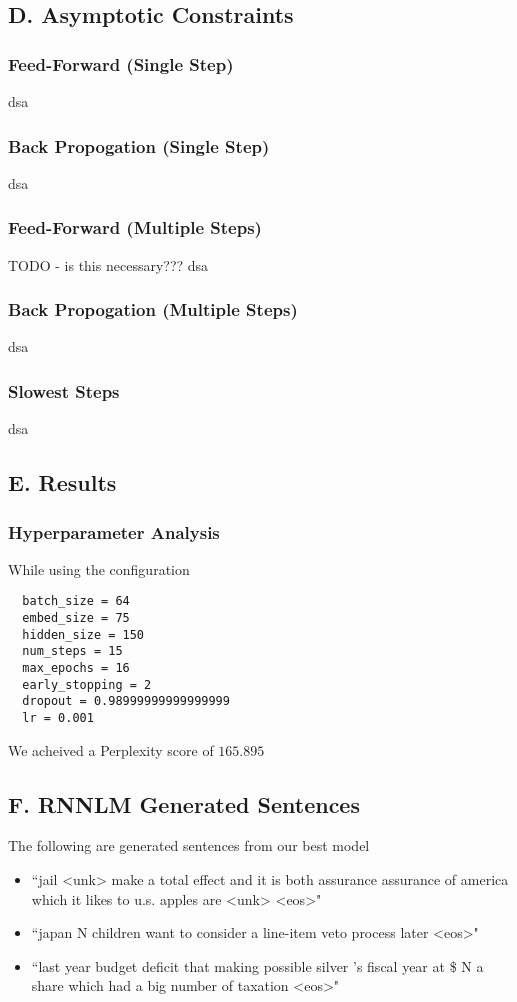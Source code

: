 \documentclass{article}
\begin{document}
\subsection*{D. Asymptotic Constraints}
\subsubsection*{Feed-Forward (Single Step)}
dsa

\subsubsection*{Back Propogation (Single Step)}
dsa

\subsubsection*{Feed-Forward (Multiple Steps)}
TODO - is this necessary??? dsa

\subsubsection*{Back Propogation (Multiple Steps)}
dsa

\subsubsection*{Slowest Steps}
dsa


\subsection*{E. Results}
\subsubsection*{Hyperparameter Analysis}
While using the configuration
\begin{lstlisting}
  batch_size = 64
  embed_size = 75
  hidden_size = 150
  num_steps = 15
  max_epochs = 16
  early_stopping = 2
  dropout = 0.98999999999999999
  lr = 0.001
\end{lstlisting}

We acheived a Perplexity score of $165.895$

\subsection*{F. \textbf{RNNLM} Generated Sentences }
The following are generated sentences from our best model
\begin{itemize}
\item ``jail <unk> make a total effect and it is both assurance assurance of america which it likes to u.s. apples are <unk> <eos>"
\item ``japan N children want to consider a line-item veto process later <eos>"
\item ``last year budget deficit that making possible silver 's fiscal year at \$ N a share which had a big number of taxation <eos>"
\end{itemize}
\end{document}
